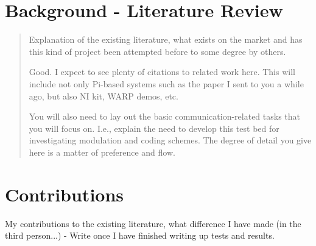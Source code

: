 \documentclass[../main.tex]{subfiles}
\begin{document}

\section{Background - Literature Review} \label{sec_Lit Review}

\begin{quotation}
	Explanation of the existing literature, what exists on the market and has this kind of project been attempted before to some degree by others.
	
	Good.  I expect to see plenty of citations to related work here.  This will include not only Pi-based systems such as the paper I sent to you a while ago, but also NI kit, WARP demos, etc.
	
	You will also need to lay out the basic communication-related tasks that you will focus on.  I.e., explain the need to develop this test bed for investigating modulation and coding schemes.  The degree of detail you give here is a matter of preference and flow.
\end{quotation}




\section{Contributions}

My contributions to the existing literature, what difference I have made (in the third person...) - Write once I have finished writing up tests and results.
\end{document}
